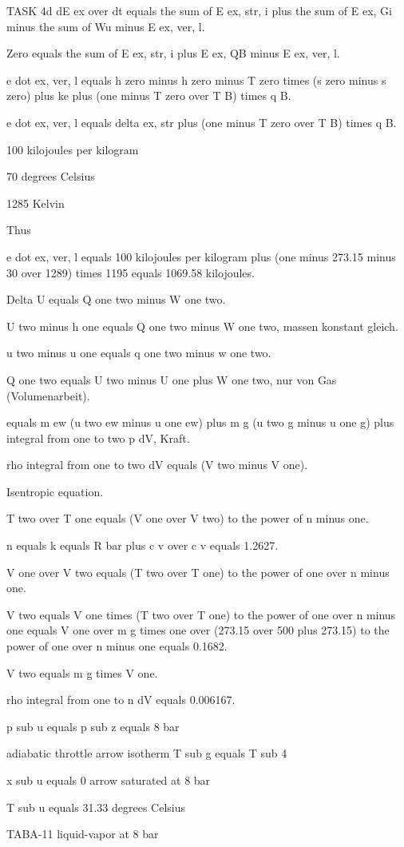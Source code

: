 TASK 4d
dE ex over dt equals the sum of E ex, str, i plus the sum of E ex, Gi minus the sum of Wu minus E ex, ver, l.

Zero equals the sum of E ex, str, i plus E ex, QB minus E ex, ver, l.

e dot ex, ver, l equals h zero minus h zero minus T zero times (s zero minus s zero) plus ke plus (one minus T zero over T B) times q B.

e dot ex, ver, l equals delta ex, str plus (one minus T zero over T B) times q B.

100 kilojoules per kilogram

70 degrees Celsius

1285 Kelvin

Thus

e dot ex, ver, l equals 100 kilojoules per kilogram plus (one minus 273.15 minus 30 over 1289) times 1195 equals 1069.58 kilojoules.

Delta U equals Q one two minus W one two.

U two minus h one equals Q one two minus W one two, massen konstant gleich.

u two minus u one equals q one two minus w one two.

Q one two equals U two minus U one plus W one two, nur von Gas (Volumenarbeit).

equals m ew (u two ew minus u one ew) plus m g (u two g minus u one g) plus integral from one to two p dV, Kraft.

rho integral from one to two dV equals (V two minus V one).

Isentropic equation.

T two over T one equals (V one over V two) to the power of n minus one.

n equals k equals R bar plus c v over c v equals 1.2627.

V one over V two equals (T two over T one) to the power of one over n minus one.

V two equals V one times (T two over T one) to the power of one over n minus one equals V one over m g times one over (273.15 over 500 plus 273.15) to the power of one over n minus one equals 0.1682.

V two equals m g times V one.

rho integral from one to n dV equals 0.006167.

p sub u equals p sub z equals 8 bar

adiabatic throttle arrow isotherm T sub g equals T sub 4

x sub u equals 0 arrow saturated at 8 bar

T sub u equals 31.33 degrees Celsius

TABA-11 liquid-vapor at 8 bar